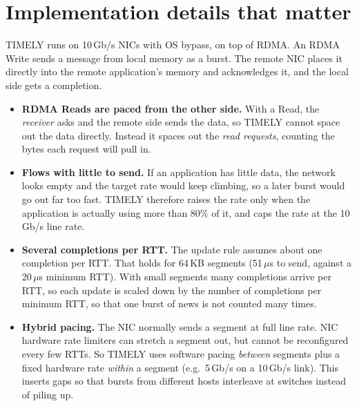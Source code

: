 \section{Implementation details that matter}
TIMELY runs on 10\,Gb/s NICs with OS bypass, on top of RDMA. An RDMA Write sends a message from local memory as a burst. The remote NIC
places it directly into the remote application's memory and acknowledges it, and the local side gets a completion.
\begin{itemize}
  \item \textbf{RDMA Reads are paced from the other side.} With a Read, the \emph{receiver} asks and the remote side sends the data, so TIMELY cannot
        space out the data directly. Instead it spaces out the \emph{read requests}, counting the bytes each request will pull in.
  \item \textbf{Flows with little to send.} If an application has little data, the network looks empty and the target rate would keep climbing,
        so a later burst would go out far too fast. TIMELY therefore raises the rate only when the application is actually using more than 80\% of
        it, and caps the rate at the 10\,Gb/s line rate.
  \item \textbf{Several completions per RTT.} The update rule assumes about one completion per RTT. That holds for 64\,KB segments (51\,$\mu$s to
        send, against a 20\,$\mu$s minimum RTT). With small segments many completions arrive per RTT, so each update is scaled down by the number
        of completions per minimum RTT, so that one burst of news is not counted many times.
  \item \textbf{Hybrid pacing.} The NIC normally sends a segment at full line rate. NIC hardware rate limiters can stretch a segment out, but cannot
        be reconfigured every few RTTs. So TIMELY uses software pacing \emph{between} segments plus a fixed hardware rate \emph{within} a segment
        (e.g.\ 5\,Gb/s on a 10\,Gb/s link). This inserts gaps so that bursts from different hosts interleave at switches instead of piling up.
\end{itemize}

